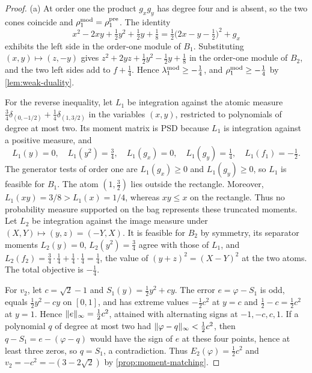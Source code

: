 \begin{proof}
(a) At order one the product $g_xg_y$ has degree four and is absent, so the
two cones coincide and $\rho^{\mathrm{mod}}_1=\rho^{\mathrm{pre}}_1$. The identity
\begin{equation}\label{eq:shp-order-one}
  x^2-2xy+\tfrac12y^2+\tfrac12y+\tfrac18
  =\tfrac12\bigl(2x-y-\tfrac12\bigr)^2+g_x
\end{equation}
exhibits the left side in the order-one module of $B_1$. Substituting
$(x,y)\mapsto(z,-y)$ gives
$z^2+2yz+\frac12y^2-\frac12y+\frac18$ in the order-one module of $B_2$, and
the two left sides add to $f+\frac14$. Hence $\lambda^{\mathrm{mod}}_1\ge-\frac14$, and
$\rho^{\mathrm{mod}}_1\ge-\frac14$ by \cref{lem:weak-duality}.

For the reverse inequality, let $L_1$ be integration against the atomic
measure $\frac34\delta_{(0,-1/2)}+\frac14\delta_{(1,3/2)}$ in the variables
$(x,y)$, restricted to polynomials of degree at most two. Its moment matrix
is PSD because $L_1$ is integration against a positive measure, and
\[
  L_1(y)=0,\quad L_1(y^2)=\tfrac34,\quad L_1(g_x)=0,\quad L_1(g_y)=\tfrac14,
  \quad L_1(f_1)=-\tfrac12 .
\]
The generator tests of order one are $L_1(g_x)\ge0$ and $L_1(g_y)\ge0$, so
$L_1$ is feasible for $B_1$. The atom $(1,\frac32)$ lies outside the
rectangle. Moreover, $L_1(xy)=3/8>L_1(x)=1/4$, whereas $xy\le x$
on the rectangle. Thus no probability measure supported on the bag
represents these truncated moments. Let $L_2$ be integration against the image measure under
$(X,Y)\mapsto(y,z)=(-Y,X)$. It is feasible for $B_2$ by symmetry, its
separator moments $L_2(y)=0$, $L_2(y^2)=\frac34$ agree with those of $L_1$,
and $L_2(f_2)=\frac34\cdot\frac14+\frac14\cdot\frac14=\frac14$, the value
of $(y+z)^2=(X-Y)^2$ at the two atoms. The total objective is $-\frac14$.

For $v_2$, let $c=\sqrt2-1$ and $S_1(y)=\frac12y^2+cy$. The error
$e=\varphi-S_1$ is odd, equals $\frac12y^2-cy$ on $[0,1]$, and has extreme
values $-\frac12c^2$ at $y=c$ and $\frac12-c=\frac12c^2$ at $y=1$. Hence
$\lVert e\rVert_\infty=\frac12c^2$, attained with alternating signs at
$-1,-c,c,1$. If a polynomial $q$ of degree at most two had
$\lVert \varphi-q\rVert_\infty<\frac12c^2$, then $q-S_1=e-(\varphi-q)$ would have
the sign of $e$ at these four points, hence at least three zeros, so
$q=S_1$, a contradiction. Thus $E_2(\varphi)=\frac12c^2$ and
$v_2=-c^2=-(3-2\sqrt2)$ by \cref{prop:moment-matching}.


\end{proof}
